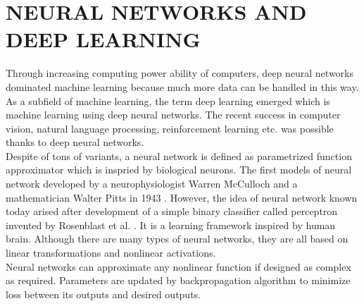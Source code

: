 \chapter{NEURAL NETWORKS AND DEEP LEARNING}
\label{chap:dnns}

Through increasing computing power ability of computers, deep neural networks dominated machine learning because much more data can be handled in this way. As a subfield of machine learning, the term deep learning emerged which is machine learning using deep neural networks. The recent success in computer vision, natural language processing, reinforcement learning etc. was possible thanks to deep neural networks. \\
Despite of tons of variants, a neural network is defined as parametrized function approximator which is inspried by biological neurons. The first models of neural network developed by a neurophysiologist Warren McCulloch and a mathematician Walter Pitts in 1943 \cite{mcculloch_logical_1943}. However, the idea of neural network known today arised after development of a simple binary classifier called perceptron invented by Rosenblast et al. \cite{rosenblatt_perceptron_1958}. It is a learning framework inspired by human brain. Although there are many types of neural networks, they are all based on linear transformations and nonlinear activations.\\
Neural networks can approximate any nonlinear function if designed as complex as required. Parameters are updated by backpropagation algorithm to minimize loss between its outputs and desired outputs.